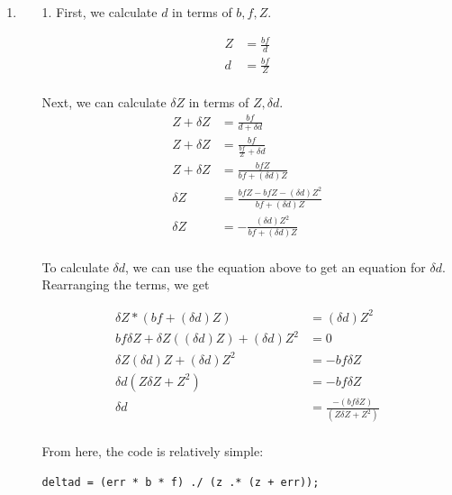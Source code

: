 \documentclass[11pt]{article}
\begin{document}
\begin{enumerate}
\begin{enumerate}
\end{enumerate}

\newpage

\item
\begin{enumerate}
\item[1.]
First, we calculate $d$ in terms of $b, f, Z$.

\begin{align*}
Z &= \frac{bf}{d} \\
d &= \frac{bf}{Z} \\
\end{align*}

Next, we can calculate $\delta Z$ in terms of $Z, \delta d$.
\begin{align*}
Z + \delta Z &= \frac{bf}{d + \delta d} \\
Z + \delta Z &= \frac{bf}{\frac{bf}{Z} + \delta d} \\
Z + \delta Z &= \frac{bfZ}{bf + (\delta d) Z} \\
\delta Z &= \frac{bfZ - bfZ - (\delta d) Z^2}{bf + (\delta d) Z} \\
\delta Z &= -\frac{(\delta d) Z^2}{bf + (\delta d) Z} \\
\end{align*}

To calculate $\delta d$, we can use the equation above to get an equation for
$\delta d$. Rearranging the terms, we get

\begin{align*}
\delta Z * (bf + (\delta d) Z) &= (\delta d) Z^2 \\
bf \delta Z + \delta Z (( \delta d) Z) + (\delta d) Z^2 &= 0 \\
\delta Z (\delta d) Z + (\delta d) Z^2 &= - bf \delta Z  \\
\delta d (Z \delta Z + Z^2) &= - bf \delta Z \\
\delta d  &= \frac{- (bf \delta Z)}{(Z \delta Z + Z^2)} \\
\end{align*}

From here, the code is relatively simple:
\begin{verbatim}
deltad = (err * b * f) ./ (z .* (z + err));
\end{verbatim}

\end{enumerate}

\end{enumerate}
\end{document}
